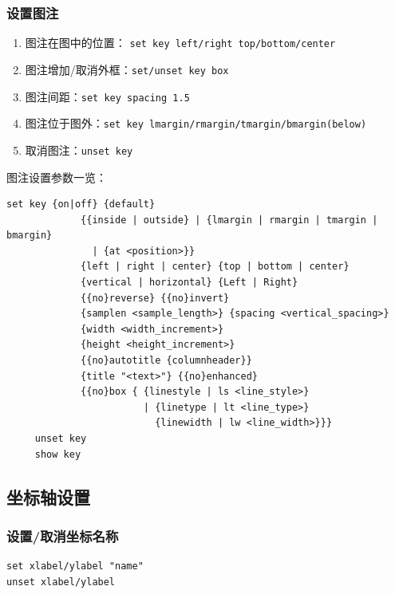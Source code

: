 \subsubsection{设置图注}
\begin{enumerate}
\item 图注在图中的位置：
\verb*|set key left/right top/bottom/center|

\item 图注增加/取消外框：\verb*|set/unset key box|

\item 图注间距：\verb*|set key spacing 1.5|

\item 图注位于图外：\verb*|set key lmargin/rmargin/tmargin/bmargin(below)|

\item 取消图注：\verb*|unset key|
\end{enumerate}

图注设置参数一览：
\begin{verbatim}
set key {on|off} {default}
             {{inside | outside} | {lmargin | rmargin | tmargin | bmargin}
               | {at <position>}}
             {left | right | center} {top | bottom | center}
             {vertical | horizontal} {Left | Right}
             {{no}reverse} {{no}invert}
             {samplen <sample_length>} {spacing <vertical_spacing>}
             {width <width_increment>}
             {height <height_increment>}
             {{no}autotitle {columnheader}}
             {title "<text>"} {{no}enhanced}
             {{no}box { {linestyle | ls <line_style>}
                        | {linetype | lt <line_type>}
                          {linewidth | lw <line_width>}}}
     unset key
     show key
\end{verbatim}



\subsection{坐标轴设置}
\subsubsection{设置/取消坐标名称}
 \begin{verbatim}
set xlabel/ylabel "name"
unset xlabel/ylabel
\end{verbatim}


